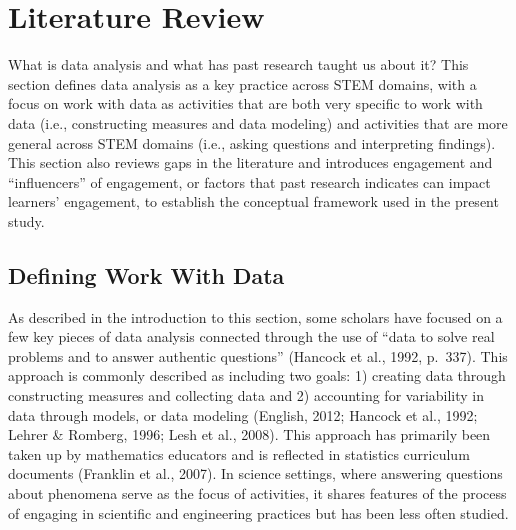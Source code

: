 \documentclass[]{msu-thesis}
\theoremstyle{definition}
\theoremstyle{definition}
\theoremstyle{definition}
\theoremstyle{remark}
\begin{document}
\chapter{Literature Review}\label{literature-review}

What is data analysis and what has past research taught us about it?
This section defines data analysis as a key practice across STEM
domains, with a focus on work with data as activities that are both very
specific to work with data (i.e., constructing measures and data
modeling) and activities that are more general across STEM domains
(i.e., asking questions and interpreting findings). This section also
reviews gaps in the literature and introduces engagement and
``influencers'' of engagement, or factors that past research indicates
can impact learners' engagement, to establish the conceptual framework
used in the present study.

\section{Defining Work With Data}\label{defining-work-with-data}

As described in the introduction to this section, some scholars have
focused on a few key pieces of data analysis connected through the use
of ``data to solve real problems and to answer authentic questions''
(Hancock et al., 1992, p.~337). This approach is commonly described as
including two goals: 1) creating data through constructing measures and
collecting data and 2) accounting for variability in data through
models, or data modeling (English, 2012; Hancock et al., 1992; Lehrer \&
Romberg, 1996; Lesh et al., 2008). This approach has primarily been
taken up by mathematics educators and is reflected in statistics
curriculum documents (Franklin et al., 2007). In science settings, where
answering questions about phenomena serve as the focus of activities, it
shares features of the process of engaging in scientific and engineering
practices but has been less often studied.
\end{document}
